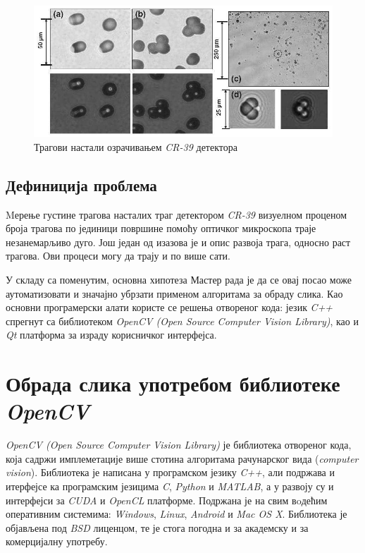 \documentclass[11pt,a4paper,serbian,oneside]{book}
\begin{document}
\begin{figure}[h]
\begin{center}
\includegraphics[width=150mm]{images/dosimetry.png}
\end{center}
\caption{Трагови настали озрачивањем \textit{CR-39} детектора}
\label{fig:trag}
\end{figure}

\section{Дефиниција проблема}

Mерење густине трагова насталих траг детектором \textit{CR-39} визуелном проценом броја трагова по јединици површине помоћу оптичког микроскопа траје незанемарљиво дуго. Још један од изазова је и опис развоја трага, односно раст трагова. Ови процеси могу да трају и по више сати. 

У складу са поменутим, основна хипотеза Мастер рада је да се овај посао може аутоматизовати и значајно убрзати применом алгоритама за обраду слика. Као основни програмерски алати користе се решења отвореног кода:
језик \textit{C++} спрегнут са библиотеком \textit{OpenCV (Open Source Computer Vision Library)}, као и \textit{Qt} платформа за израду корисничког интерфејса.

%
%
%

\chapter{Обрада слика употребом библиотеке \textit{OpenCV}}

\textit{OpenCV (Open Source Computer Vision Library)} \cite{opencv} је библиотека отвореног кода, која садржи имплеметације више стотина алгоритама рачунарског вида (\textit{computer vision}). Библиотека је написана у  програмском језику \textit{C++}, али подржава и итерфејсе ка програмским језицима \textit{C}, \textit{Python} и \textit{MATLAB}, а у развоју су и интерфејси за \textit{CUDA} и \textit{OpenCL} платформе. Подржана је на свим вoдећим оперативним системима: \textit{Windows}, \textit{Linux}, \textit{Android} и \textit{Mac OS X}. Библиотека је објављена под \textit{BSD} лиценцом, те је стога погодна  и за академску и за комерцијалну употребу.
\end{document}
